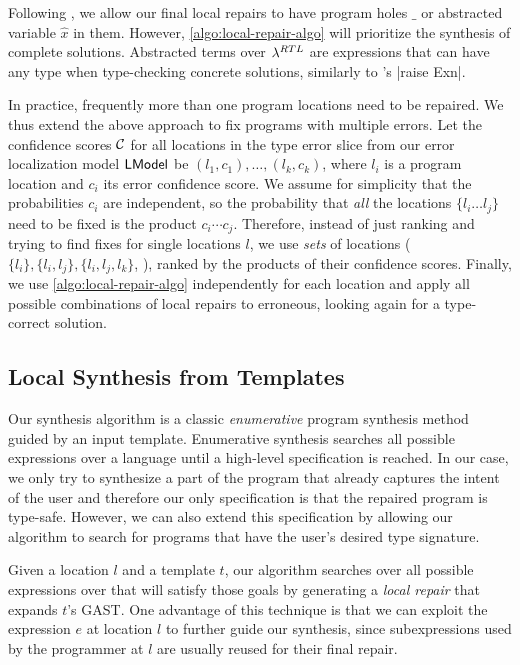 Following \citep{Lerner2007-dt}, we allow our final local repairs to have
program holes $\_$ or abstracted variable $\hat{x}$ in them. However,
\autoref{algo:local-repair-algo} will prioritize the synthesis of complete
solutions. Abstracted terms over $\lambda^{RTL}$ are expressions that can have any
type when type-checking concrete solutions, \eg similarly to \ocaml's |raise Exn|.


In practice, frequently more than one program locations need to be repaired. We
thus extend the above approach to fix programs with multiple errors. Let the
confidence scores $\mathcal{C}$ for all locations in the type error slice from our
error localization model $\mathsf{LModel}$ be $(l_1, c_1), \dots, (l_k, c_k)$, where
$l_i$ is a program location and $c_i$ its error confidence score. We assume for
simplicity that the probabilities $c_i$ are independent, so the probability that
\emph{all} the locations $\{l_i \dots l_j\}$ need to be fixed is the product
$c_i \cdots c_j$. Therefore, instead of just ranking and trying to find fixes
for single locations $l$, we use \emph{sets} of locations ($\{l_i\}, \{l_i,
l_j\}, \{l_i, l_j, l_k\}$, \etc), ranked by the products of their confidence
scores. Finally, we use \autoref{algo:local-repair-algo} independently for each
location and apply all possible combinations of local repairs to erroneous,
looking again for a type-correct solution.


\subsection{Local Synthesis from Templates}
\label{subsec:local-synthesis}

Our synthesis algorithm is a classic \emph{enumerative} program synthesis method
guided by an input template. Enumerative synthesis searches all possible
expressions over a language until a high-level
specification is reached. In our case, we only try to synthesize a part of the
program that already captures the intent of the user and therefore our only
specification is that the repaired program is type-safe. However, we can also
extend this specification by allowing our algorithm to search for programs that
have the user's desired type signature.

Given a location $l$ and a template $t$, our algorithm searches over all
possible expressions over \lang that will satisfy those goals by generating a
\emph{local repair} that expands $t$'s GAST. One advantage of this technique
is that we can exploit the expression $e$ at location $l$ to further guide our
synthesis, since subexpressions used by the programmer at $l$ are usually reused
for their final repair.

